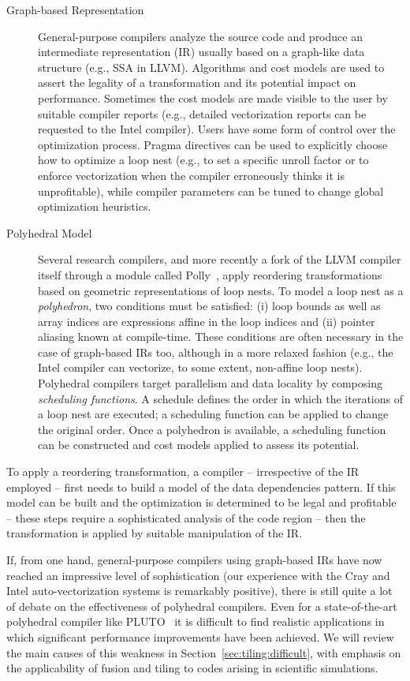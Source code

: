 \begin{description}
\item[Graph-based Representation] General-purpose compilers analyze the source code and produce an intermediate representation (IR) usually based on a graph-like data structure (e.g., SSA in LLVM). Algorithms and cost models are used to assert the legality of a transformation and its potential impact on performance. Sometimes the cost models are made visible to the user by suitable compiler reports (e.g., detailed vectorization reports can be requested to the Intel compiler). Users have some form of control over the optimization process. Pragma directives can be used to explicitly choose how to optimize a loop nest (e.g., to set a specific unroll factor or to enforce vectorization when the compiler erroneously thinks it is unprofitable), while compiler parameters can be tuned to change global optimization heuristics. 
\item[Polyhedral Model] Several research compilers, and more recently a fork of the LLVM compiler itself through a module called Polly~\cite{polly}, apply reordering transformations based on geometric representations of loop nests. To model a loop nest as a {\em polyhedron}, two conditions must be satisfied: (i) loop bounds as well as array indices are expressions affine in the loop indices and (ii) pointer aliasing known at compile-time. These conditions are often necessary in the case of graph-based IRs too, although in a more relaxed fashion (e.g., the Intel compiler can vectorize, to some extent, non-affine loop nests). Polyhedral compilers target parallelism and data locality by composing {\em scheduling functions}. A schedule defines the order in which the iterations of a loop nest are executed; a scheduling function can be applied to change the original order. Once a polyhedron is available, a scheduling function can be constructed and cost models applied to assess its potential.
\end{description}

To apply a reordering transformation, a compiler -- irrespective of the IR employed -- first needs to build a model of the data dependencies pattern. If this model can be built and the optimization is determined to be legal and profitable -- these steps require a sophisticated analysis of the code region -- then the transformation is applied by suitable manipulation of the IR. 

If, from one hand, general-purpose compilers using graph-based IRs have now reached an impressive level of sophistication (our experience with the Cray and Intel auto-vectorization systems is remarkably positive), there is still quite a lot of debate on the effectiveness of polyhedral compilers. Even for a state-of-the-art polyhedral compiler like PLUTO~\citep{pluto} it is difficult to find realistic applications in which significant performance improvements have been achieved. We will review the main causes of this weakness in Section~\ref{sec:tiling:difficult}, with emphasis on the applicability of fusion and tiling to codes arising in scientific simulations. 


